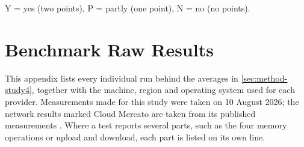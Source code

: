\begin{table}[p]
  \vspace{3pt}
  {\footnotesize\raggedright Y = yes (two points), P = partly (one point),
  N = no (no points).\par}
\end{table}

\chapter{Benchmark Raw Results}
\label{app:benchmark-raw}

This appendix lists every individual run behind the averages in
\cref{sec:method-study4}, together with the machine, region and operating system used
for each provider. Measurements made for this study were taken on 10 August 2026;
the network results marked Cloud Mercato are taken from its published measurements
\cite{CloudMercato_AWS_m6i,CloudMercato_Scaleway_POP2,CloudMercato_TSystems_s3}.
Where a test reports several parts, such as the four memory operations or upload and
download, each part is listed on its own line.

